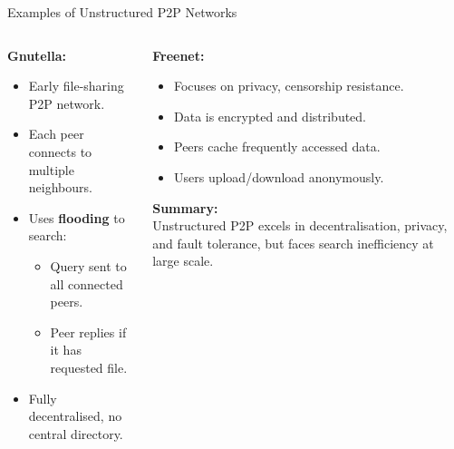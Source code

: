 \documentclass[aspectratio=169, table]{beamer}
\begin{document}
\begin{frame}{Examples of Unstructured P2P Networks}
	\vspace{20pt}
	\begin{columns}[t]
		
		\begin{column}{0.5\textwidth}
			\textbf{Gnutella:}
			\begin{itemize}
				\item Early file-sharing P2P network.
				\item Each peer connects to multiple neighbours.
				\item Uses \textbf{flooding} to search:
				\begin{itemize}
					\item Query sent to all connected peers.
					\item Peer replies if it has requested file.
				\end{itemize}
				\item Fully decentralised, no central directory.
			\end{itemize}
		\end{column}
		
		\begin{column}{0.5\textwidth}
			\textbf{Freenet:}
			\begin{itemize}
				\item Focuses on privacy, censorship resistance.
				\item Data is encrypted and distributed.
				\item Peers cache frequently accessed data.
				\item Users upload/download anonymously.
			\end{itemize}
			
			\vspace{10pt}
			\textbf{Summary:} \\
			Unstructured P2P excels in decentralisation, privacy, and fault tolerance, but faces search inefficiency at large scale.
		\end{column}
		
	\end{columns}
\end{frame}
\end{document}
